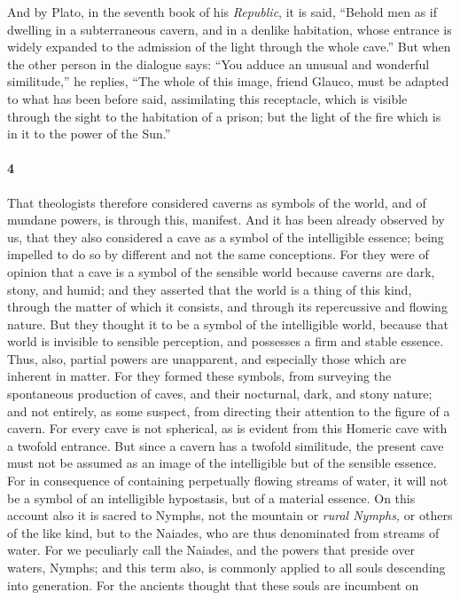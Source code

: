 \documentclass[a4paper,12pt]{article}
\begin{document}
\noindent And by Plato, in the seventh book of his \textit{Republic}, it is
said, ``Behold men as if dwelling in a subterraneous cavern, and in a denlike
habitation, whose entrance is widely expanded to the admission of the light
through the whole cave.'' But when the other person in the dialogue says: ``You
adduce an unusual and wonderful similitude,'' he replies, ``The whole of this
image, friend Glauco, must be adapted to what has been before said,
assimilating this receptacle, which is visible through the sight to the
habitation of a prison; but the light of the fire which is in it to the power
of the Sun.''


\paragraph{4} That theologists therefore considered caverns as symbols of the
world, and of mundane powers, is through this, manifest. And it has been
already observed by us, that they also considered a cave as a symbol of the
intelligible essence; being impelled to do so by different and not the same
conceptions. For they were of opinion that a cave is a symbol of the sensible
world because caverns are dark, stony, and humid; and they asserted that the
world is a thing of this kind, through the matter of which it consists, and
through its repercussive and flowing nature. But they thought it to be a symbol
of the intelligible world, because that world is invisible to sensible
perception, and possesses a firm and stable essence. Thus, also, partial powers
are unapparent, and especially those which are inherent in matter. For they
formed these symbols, from surveying the spontaneous production of caves, and
their nocturnal, dark, and stony nature; and not entirely, as some suspect,
from directing their attention to the figure of a cavern. For every cave is not
spherical, as is evident from this Homeric cave with a twofold entrance. But
since a cavern has a twofold similitude, the present cave must not be assumed
as an image of the intelligible but of the sensible essence. For in consequence
of containing perpetually flowing streams of water, it will not be a symbol of
an intelligible hypostasis, but of a material essence. On this account also it
is sacred to Nymphs, not the mountain or \textit{rural Nymphs,} or others of
the like kind, but to the Naiades, who are thus denominated from streams of
water. For we peculiarly call the Naiades, and the powers that preside over
waters, Nymphs; and this term also, is commonly applied to all souls descending
into generation. For the ancients thought that these souls are incumbent on
\end{document}
